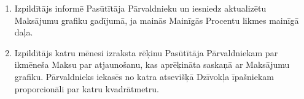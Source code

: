 \begin{enumerate}[label=\arabic*.]

\begin{center}
\end{center}


	\item Izpildītājs informē Pasūtītāja Pārvaldnieku un iesniedz aktualizētu Maksājumu grafiku gadījumā, ja mainās Mainīgās Procentu likmes mainīgā daļa.
	\item Izpildītājs katru mēnesi izraksta rēķinu Pasūtītāja Pārvaldniekam par ikmēneša Maksu par atjaunošanu, kas aprēķināta saskaņā ar Maksājumu grafiku. Pārvaldnieks iekasēs no katra atsevišķā Dzīvokļa īpašniekam proporcionāli par katru kvadrātmetru.
\end{enumerate}
